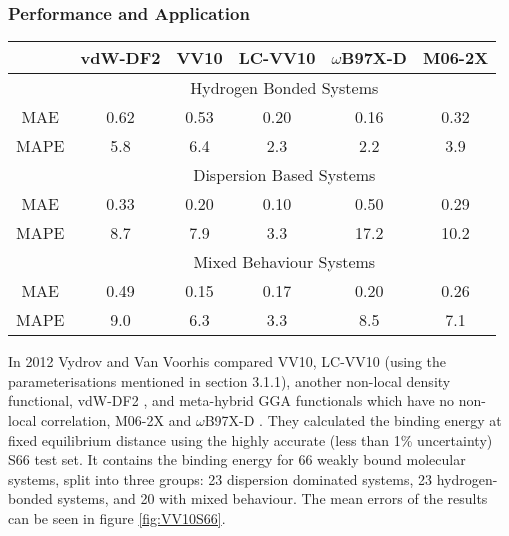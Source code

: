 \documentclass[10pt,a4paper,twocolumn,twoside]{extarticle}
\newcommand{\kcal}{kcal mol\(^{-1}\)}
\begin{document}
	\subsubsection{Performance and Application}
	\begin{figure*}
		\centering
		\begin{tabular}[]{c|c c c c c}
			& vdW-DF2 & VV10 & LC-VV10 & $\omega$B97X-D & M06-2X\\
			\hline
			& \multicolumn{5}{c}{Hydrogen Bonded Systems}\\
			MAE & 0.62 & 0.53 & 0.20 & 0.16 & 0.32\\
			MAPE & 5.8 & 6.4 & 2.3 & 2.2 & 3.9\\
			& \multicolumn{5}{c}{Dispersion Based Systems}\\
			MAE & 0.33 & 0.20 & 0.10 & 0.50 & 0.29\\
			MAPE & 8.7 & 7.9 & 3.3 & 17.2 & 10.2\\
			& \multicolumn{5}{c}{Mixed Behaviour Systems}\\
			MAE & 0.49 & 0.15 & 0.17 & 0.20 & 0.26\\
			MAPE & 9.0 & 6.3 & 3.3 & 8.5 & 7.1\\
		\end{tabular}
		\caption{Errors of the binding energy at equilibrium distance for the functionals benchmarked against the S66 test set for weakly bounded systems in Ref \cite{Vydrov2012}, where MAE is the mean absolute error in \kcal and MPE is the mean absolute percentage error. }
		\label{fig:VV10S66}
	\end{figure*}
		
	
	In 2012 Vydrov and Van Voorhis compared VV10, LC-VV10 (using the parameterisations mentioned in section 3.1.1), another non-local density functional, vdW-DF2 \cite{Lee2010-vdW-DF2-Original}, and meta-hybrid GGA functionals which have no non-local correlation, M06-2X \cite{M06-2X} and $\omega$B97X-D \cite{B97X-D}. They calculated the binding energy at fixed equilibrium distance using the highly accurate (less than 1\% uncertainty) S66\cite{s66a, s66b} test set. It contains the binding energy for 66 weakly bound molecular systems, split into three groups: 23 dispersion dominated systems, 23 hydrogen-bonded systems, and 20 with mixed behaviour. The mean errors of the results can be seen in figure \ref{fig:VV10S66}.
\end{document}
